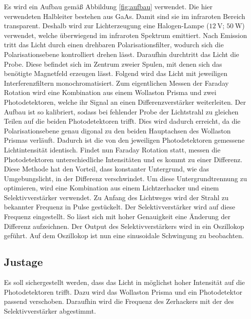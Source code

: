 Es wird ein Aufbau gemäß Abbildung \ref{fig:aufbau} verwendet. 
Die hier verwendeten Halbleiter bestehen aus GaAs. 
Damit sind sie im infraroten Bereich transparent.
Deshalb wird zur Lichterzeugung eine Halogen-Lampe ($\SI{12}{\volt}$; $\SI{50}{\watt}$) verwendet, welche überwiegend im infraroten Spektrum emittiert.
Nach Emission tritt das Licht durch einen drehbaren Polarisationsfilter, wodurch sich die Polarisationsebene kontrolliert drehen lässt.
Daraufhin durchtritt das Licht die Probe.
Diese befindet sich im Zentrum zweier Spulen, mit denen sich das benötigte Magnetfeld erzeugen lässt.
Folgend wird das Licht mit jeweiligen Interferenzfiltern monochromatisiert.
Zum eigentlichen Messen der Faraday Rotation wird eine Kombination aus einem Wollaston Prisma und zwei Photodetektoren, welche ihr Signal an einen Differenzverstärker weiterleiten.
Der Aufbau ist so kalibriert, sodass bei fehlender Probe der Lichtstrahl zu gleichen Teilen auf die beiden Photodetektoren trifft.
Dies wird dadurch erreicht, da die Polarisationsebene genau digonal zu den beiden Hauptachsen des Wollaston Prismas verläuft.
Dadurch ist die von den jeweiligen Photodetektoren gemessene Lichtintensität identisch.
Findet nun Faraday Rotation statt, messen die Photodetektoren unterschiedliche Intensitäten und es kommt zu einer Differenz.
Diese Methode hat den Vorteil, dass konstanter Untergrund, wie das Umgebungslicht, in der Differenz verschwindet.
Um diese Untergrundtrennung zu optimieren, wird eine Kombination aus einem Lichtzerhacker und einem Selektivverstärker verwendet.
Zu Anfang des Lichtweges wird der Strahl zu bekannter Frequenz in Pulse gestückelt.
Der Selektivverstärker wird auf diese Frequenz eingestellt. 
So lässt sich mit hoher Genauigkeit eine Änderung der Differenz aufzeichnen.
Der Output des Selektivverstärkers wird in ein Oszillokop geführt.
Auf dem Oszillokop ist nun eine sinusoidale Schwingung zu beobachten.


\subsection{Justage}
Es soll sichergestellt werden, dass das Licht in möglichst hoher Intensität auf die Photodetektoren trifft.
Dazu wird das Wollaston Prisma und ein Photodetektor passend verschoben.
Daraufhin wird die Frequenz des Zerhackers mit der des Selektivverstärker abgestimmt.

